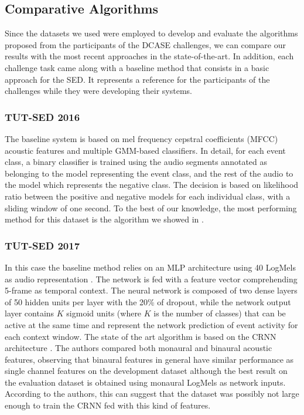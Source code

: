 \subsection{Comparative Algorithms}

Since the datasets we used were employed to develop and evaluate the algorithms proposed from the participants of the DCASE challenges, we can compare our results with the most recent approaches in the state-of-the-art. In addition, each challenge task came along with a baseline method that consists in a basic approach for the SED. It represents a reference for the participants of the challenges while they were developing their systems.

\subsubsection{TUT-SED 2016}
The baseline system is based on mel frequency cepstral coefficients (MFCC) acoustic features and multiple GMM-based classifiers. In detail, for each event class, a binary classifier is trained using the audio segments annotated as belonging to the model representing the event class, and the rest of the audio to the model which represents the negative class. The decision is based on likelihood ratio between the positive and negative models for each individual class, with a sliding window of one second.
To the best of our knowledge, the most performing method for this dataset is the algorithm we showed in .


\subsubsection{TUT-SED 2017}
In this case the baseline method relies on an MLP architecture using 40 LogMels as audio representation \cite{DCASE2017challenge}. The network is fed with a feature vector comprehending 5-frame as temporal context.
The neural network is composed of two dense layers of 50 hidden units per layer with the 20\% of dropout, while the network output layer contains $K$ sigmoid units (where $K$ is
the number of classes) that can be active at the same time and represent the network prediction of event activity for each context window.
The state of the art algorithm is based on the CRNN architecture \cite{adavanne2017report}. The authors compared both monaural and binaural acoustic features, observing that binaural features in general have similar performance as single channel features on the development dataset although the best result on the evaluation dataset is obtained using monaural LogMels as network inputs. According to the authors, this can suggest that the dataset was possibly not large enough to train the CRNN fed with this kind of features.


